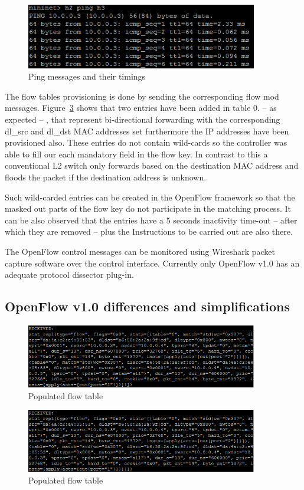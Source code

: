\documentclass{article}
\begin{document}
\begin{figure}[!htb]
    \centering
    \includegraphics[width=0.9\textwidth]{figures/ping_example.png}
    \caption{Ping messages and their timings}
    \label{fig:NOX-ping}
\end{figure}

The flow tables provisioning is done by sending the corresponding flow mod messages. Figure~\ref{fig:NOX-populated-flowtable} shows that two entries have been added in table 0. -- as expected -- , that represent bi-directional forwarding with the corresponding dl\_src and dl\_dst MAC addresses set furthermore the IP addresses have been provisioned also. These entries do not contain wild-cards so the controller was able to fill our each mandatory field in the flow key. In contrast to this a conventional L2 switch only forwards based on the destination MAC address and floods the packet if the destination address is unknown.

Such wild-carded entries can be created in the OpenFlow framework so that the masked out parts of the flow key do not participate in the matching process. It can be also observed that the entries have a 5 seconds inactivity time-out -- after which they are removed -- plus the Instructions to be carried out are also there.

The OpenFlow control messages can be monitored using Wireshark packet capture software over the control interface. Currently only OpenFlow v1.0 has an adequate protocol dissector plug-in.

\subsection{OpenFlow v1.0 differences and simplifications}

\begin{figure}[!htb]
    \centering
    \includegraphics[width=0.9\textwidth]{figures/populated_flowtable.png}
    \caption{Populated flow table}
    \label{fig:NOX-populated-flowtable}
\end{figure}

\begin{figure}[!htb]
    \centering
    \includegraphics[width=0.9\textwidth]{figures/populated_flowtable.png}
    \caption{Populated flow table}
    \label{fig:NOX-populated-flowtable}
\end{figure}
\end{document}
